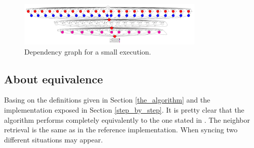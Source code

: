 \documentclass[10pt,journal,compsoc]{IEEEtran}
\let\MYoriglatexcaption\caption
\renewcommand{\caption}[2][\relax]{\MYoriglatexcaption[#2]{#2}}
\begin{document}
\begin{figure}[!t]
\centering
\includegraphics[width=3.5in]{img/complete_graph.pdf}
\caption{Dependency graph for a small execution.}
\label{dep_graf}
\end{figure}


\subsection{About equivalence}

Basing on the definitions given in Section \ref{the_algorithm} and the implementation exposed in Section \ref{step_by_step}. It is pretty clear that the algorithm performs completely equivalently to the one stated in \cite{ReferencePaper}. The neighbor retrieval is the same as in the reference implementation. When syncing two different situations may appear.
\end{document}

